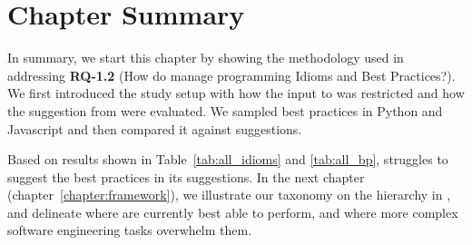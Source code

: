 \section{Chapter Summary}
In summary, we start this chapter by showing the methodology used in addressing \textbf{RQ-1.2} (How do \cct{} manage programming Idioms and Best Practices?). We first introduced the study setup with how the input to \cop{} was restricted and how the suggestion from \cop{} were evaluated. We sampled best practices in Python and Javascript and then compared it against \cop{} suggestions. 

Based on results shown in Table~\ref{tab:all_idioms} and \ref{tab:all_bp}, \cop{} struggles to suggest the best practices in its suggestions. In the next chapter (chapter~\ref{chapter:framework}), we illustrate our taxonomy on the hierarchy in \AISE{}, and delineate where \cct{} are currently best able to perform, and where more complex software engineering tasks overwhelm them.